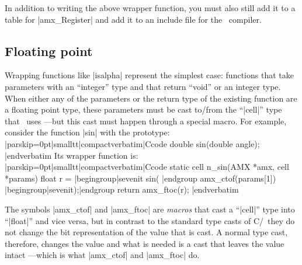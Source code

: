 In addition to writing the above wrapper function, you must also still add it to a
table for |amx_Register| and add it to an include file for the \Small\ compiler.

\subsection{Floating point}
Wrapping functions like |isalpha| represent the simplest case: functions that
take parameters with an ``integer'' type and that return ``void'' or an integer
type. When either any of the parameters or the return type of the existing function
are a floating point type, these parameters must be cast to\slash from the ``|cell|''
type that \Small\ uses ---but this cast must happen through a special macro.
For example, consider the function |sin| with the prototype:
\goodbreak
\listingx\verbatim|parskip=0pt|smalltt|compactverbatim|Ccode
double sin(double angle);
|endverbatim\endlistingx
\goodbreak
Its wrapper function is:
\listingx\verbatim|parskip=0pt|smalltt|compactverbatim|Ccode
static cell n_sin(AMX *amx, cell *params)
{
  float r = |begingroup|sevenit sin( |endgroup amx_ctof(params[1]) |begingroup|sevenit);|endgroup
  return amx_ftoc(r);
}
|endverbatim\endlistingx

The symbols |amx_ctof| and |amx_ftoc| are {\it macros\/} that cast a ``|cell|''
type into ``|float|'' and vice versa, but in contrast to the standard type casts
of C/\Cpp\ they do not change the bit representation of the value that is cast.
A normal type cast, therefore, changes the value and what is needed is a cast that leaves
the value intact ---which is what |amx_ctof| and |amx_ftoc| do.

